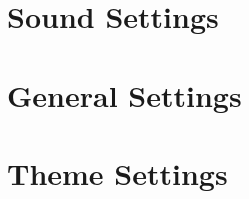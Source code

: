 \chapter{Sound Settings}
\label{ref:configure_rockbox_sound}
  

\chapter{General Settings}
\label{ref:configure_rockbox_general}
  
    
    
    
    
    
    
    
    
    

\chapter{Theme Settings}
\label{ref:configure_rockbox_themes}
  


